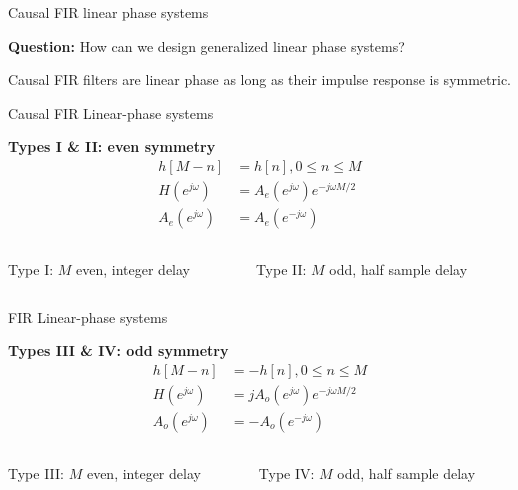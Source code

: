 \documentclass[10pt]{beamer}
\begin{document}
\begin{frame}{Causal FIR linear phase systems}
	
	\textbf{Question:} How can we design generalized linear phase systems?
	
	\pause
	
	Causal FIR filters are linear phase as long as their impulse response is symmetric.

\end{frame}

\begin{frame}{Causal FIR Linear-phase systems}

\textbf{Types I \& II: even symmetry}
\begin{align}
h[M-n] &= h[n], 0 \leq n \leq M \tag{even symmetry} \\
H(e^{j\omega}) &= A_e(e^{j\omega})e^{-j\omega M/2} \tag{Delay of $M/2$} \\
A_e(e^{j\omega}) &= A_e(e^{-j\omega}) \tag{due to even symmetry}
\end{align}

\begin{columns}
	\begin{column}{0.5\textwidth}
		Type I: $M$ even, integer delay
	\end{column}
	\begin{column}{0.5\textwidth}
		Type II: $M$ odd, half sample delay
	\end{column}
\end{columns}

\begin{center}
	\resizebox{\linewidth}{!}{}
\end{center}

\end{frame}

\begin{frame}{FIR Linear-phase systems}

\textbf{Types III \& IV: odd symmetry}
\begin{align}
h[M-n] &= -h[n], 0 \leq n \leq M \tag{odd symmetry} \\
H(e^{j\omega}) &= jA_o(e^{j\omega})e^{-j\omega M/2} \tag{Delay of $M/2$} \\
A_o(e^{j\omega}) &= -A_o(e^{-j\omega}) \tag{due to odd symmetry}
\end{align}

\begin{columns}
	\begin{column}{0.5\textwidth}
		Type III: $M$ even, integer delay
	\end{column}
	\begin{column}{0.5\textwidth}
		Type IV: $M$ odd, half sample delay
	\end{column}
\end{columns}

\begin{center}
	\resizebox{\linewidth}{!}{}
\end{center}

\end{frame}
\end{document}
